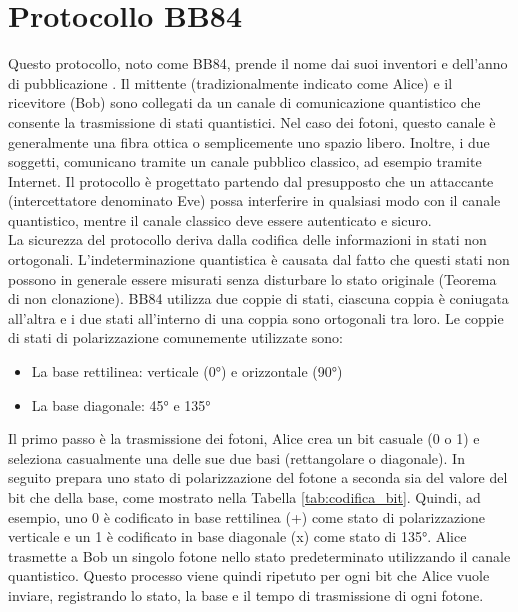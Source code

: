 \section{Protocollo BB84}
Questo protocollo, noto come BB84, prende il nome dai suoi inventori e dell'anno di pubblicazione \cite{bennett_quantum_2014}. Il mittente (tradizionalmente indicato come Alice) e il ricevitore (Bob) sono collegati da un canale di comunicazione quantistico che consente la trasmissione di stati quantistici. Nel caso dei fotoni, questo canale è generalmente una fibra ottica o semplicemente uno spazio libero. Inoltre, i due soggetti, comunicano tramite un canale pubblico classico, ad esempio tramite Internet. Il protocollo è progettato partendo dal presupposto che un attaccante (intercettatore denominato Eve) possa interferire in qualsiasi modo con il canale quantistico, mentre il canale classico deve essere autenticato e sicuro.\\
La sicurezza del protocollo deriva dalla codifica delle informazioni in stati non ortogonali. L'indeterminazione quantistica è causata dal fatto che questi stati non possono in generale essere misurati senza disturbare lo stato originale (Teorema di non clonazione). BB84 utilizza due coppie di stati, ciascuna coppia è coniugata all'altra e i due stati all'interno di una coppia sono ortogonali tra loro. Le coppie di stati di polarizzazione comunemente utilizzate sono:
\begin{itemize}
    \item La base rettilinea: verticale (0°) e orizzontale (90°)
    \item La base diagonale: 45° e 135°
\end{itemize}

Il primo passo è la trasmissione dei fotoni, Alice crea un bit casuale (0 o 1) e seleziona casualmente una delle sue due basi (rettangolare o diagonale). In seguito prepara uno stato di polarizzazione del fotone a seconda sia del valore del bit che della base, come mostrato nella Tabella \ref{tab:codifica_bit}. Quindi, ad esempio, uno 0 è codificato in base rettilinea (+) come stato di polarizzazione verticale e un 1 è codificato in base diagonale (x) come stato di 135°. Alice trasmette a Bob un singolo fotone nello stato predeterminato utilizzando il canale quantistico. Questo processo viene quindi ripetuto per ogni bit che Alice vuole inviare, registrando lo stato, la base e il tempo di trasmissione di ogni fotone.

